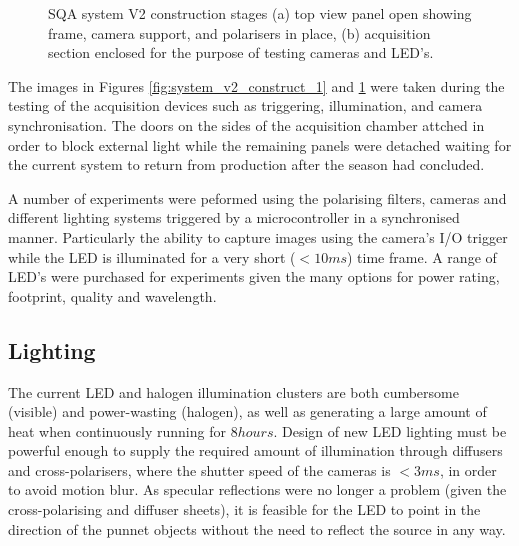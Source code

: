 \documentclass[fleqn,twoside]{article}
\begin{document}
\begin{figure}[h]
\begin{subfigure}{.5\textwidth}
		\caption{}
		\label{fig:system_v2_construct_2}
	\end{subfigure}%
	\caption{SQA system V2 construction stages (a) top view panel open showing frame, camera support, and polarisers in place, (b) acquisition section enclosed for the purpose of testing cameras and LED's.}
	\label{}
\end{figure}

The images in Figures \ref{fig:system_v2_construct_1} and \ref{fig:system_v2_construct_2} were taken during the testing of the acquisition devices such as triggering, illumination, and camera synchronisation. The doors on the sides of the acquisition chamber attched in order to block external light while the remaining panels were detached waiting for the current system to return from production after the season had concluded. 

A number of experiments were peformed using the polarising filters, cameras and different lighting systems triggered by a microcontroller in a synchronised manner. Particularly the ability to capture images using the camera's I/O trigger while the LED is illuminated for a very short ($<10ms$) time frame. A range of LED's were purchased for experiments given the many options for power rating, footprint, quality and wavelength.



\subsection{Lighting}

The current LED and halogen illumination clusters are both cumbersome (visible) and power-wasting (halogen), as well as generating a large amount of heat when continuously running for $8 hours$. Design of new LED lighting must be powerful enough to supply the required amount of illumination through diffusers and cross-polarisers, where the shutter speed of the cameras is $<3ms$, in order to avoid motion blur. As specular reflections were no longer a problem (given the cross-polarising and diffuser sheets), it is feasible for the LED to point in the direction of the punnet objects without the need to reflect the source in any way.
\end{document}
